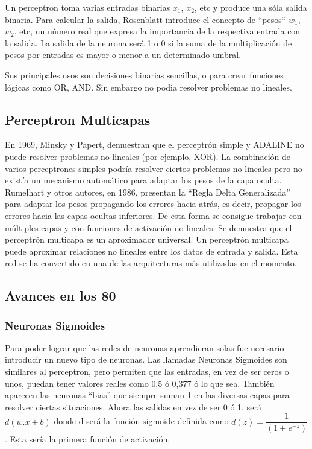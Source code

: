 \documentclass[a4paper]{article}
\begin{document}
Un perceptron toma varias entradas binarias $x_1$, $x_2$, etc y produce una sóla salida binaria. 
Para calcular la salida, Rosenblatt introduce el concepto de ``pesos`` $w_1$, $w_2$, etc, un número 
real que expresa la importancia de la respectiva entrada con la salida. La salida de la neurona 
será 1 o 0 si la suma de la multiplicación de pesos por entradas es mayor o menor a un determinado
umbral.

Sus principales usos son decisiones binarias sencillas, o para crear funciones lógicas como 
OR, AND. Sin embargo no podia resolver problemas no lineales.


\subsection{Perceptron Multicapas}

En 1969, Minsky y Papert, demuestran que el perceptrón simple y ADALINE no puede resolver 
problemas no lineales (por ejemplo, XOR). La combinación de varios perceptrones simples podría 
resolver ciertos problemas no lineales pero no existía un mecanismo automático para adaptar los 
pesos de la capa oculta. Rumelhart y otros autores, en 1986, presentan la 
``Regla Delta Generalizada'' para adaptar los pesos propagando los errores hacia atrás, es decir, 
propagar los errores hacia las capas ocultas inferiores. De esta forma se consigue trabajar con 
múltiples capas y con funciones de activación no lineales. Se demuestra que el perceptrón 
multicapa es un aproximador universal. Un perceptrón multicapa puede aproximar relaciones 
no lineales entre los datos de entrada y salida. Esta red se ha convertido en una de las 
arquitecturas más utilizadas en el momento.

\subsection{Avances en los 80}

\subsubsection{Neuronas Sigmoides}

Para poder lograr que las redes de neuronas aprendieran solas fue necesario introducir un nuevo 
tipo de neuronas. Las llamadas Neuronas Sigmoides son similares al perceptron, pero permiten 
que las entradas, en vez de ser ceros o unos, puedan tener valores reales como 0,5 ó 0,377 ó 
lo que sea. También aparecen las neuronas ``bias'' que siempre suman 1 en las diversas capas 
para resolver ciertas situaciones. Ahora las salidas en vez de ser 0 ó 1, será $d(w . x + b)$
donde d será la función sigmoide definida como $d(z) = \dfrac{1}{( 1 +e^{-z})}$ . Esta sería 
la primera función de activación.
\end{document}
